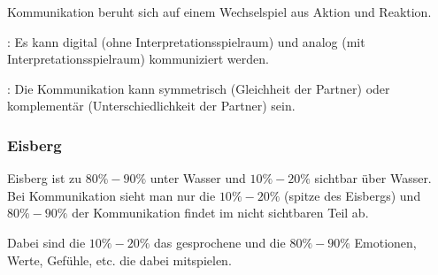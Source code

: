 Kommunikation beruht sich auf einem Wechselspiel aus Aktion und Reaktion.

: Es kann digital (ohne Interpretationsspielraum) und analog (mit Interpretationsspielraum) kommuniziert werden.

: Die Kommunikation kann symmetrisch (Gleichheit der Partner) oder komplementär (Unterschiedlichkeit der Partner) sein. 


\subsubsection{Eisberg}

 Eisberg ist zu $80\%-90\%$ unter Wasser und $10\%-20\%$ sichtbar über Wasser. Bei Kommunikation sieht man nur die $10\%-20\%$ (spitze des Eisbergs) und $80\%-90\%$ der Kommunikation findet im nicht sichtbaren Teil ab.

Dabei sind die $10\%-20\%$ das gesprochene und die $80\%-90\%$ Emotionen, Werte, Gefühle, etc. die dabei mitspielen.
